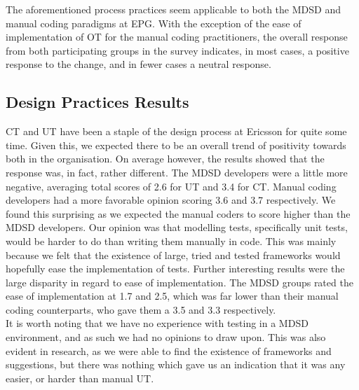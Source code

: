 \documentclass[final_report_innit.tex]{subfiles}
\begin{document}
The aforementioned process practices seem applicable to both the MDSD and manual coding paradigms at EPG. With the exception of the ease of implementation of OT for the manual coding practitioners, the overall response from both participating groups in the survey indicates, in most cases, a positive response to the change, and in fewer cases a neutral response.

\subsection{Design Practices Results}

CT and UT have been a staple of the design process at Ericsson for quite some time. Given this, we expected there to be an overall trend of positivity towards both in the organisation. On average however, the results showed that the response was, in fact, rather different. The MDSD developers were a little more negative, averaging total scores of 2.6 for UT and 3.4 for CT. Manual coding developers had a more favorable opinion scoring 3.6 and 3.7 respectively. We found this surprising as we expected the manual coders to score higher than the MDSD developers. Our opinion was that modelling tests, specifically unit tests, would be harder to do than writing them manually in code. This was mainly because we felt that the existence of large, tried and tested frameworks would hopefully ease the implementation of tests. Further interesting results were the large disparity in regard to ease of implementation. The MDSD groups rated the ease of implementation at 1.7 and 2.5, which was far lower than their manual coding counterparts, who gave them a 3.5 and 3.3 respectively.
\\

It is worth noting that we have no experience with testing in a MDSD environment, and as such we had no opinions to draw upon. This was also evident in research, as we were able to find the existence of frameworks and suggestions, but there was nothing which gave us an indication that it was any easier, or harder than manual UT.
\\
\end{document}
